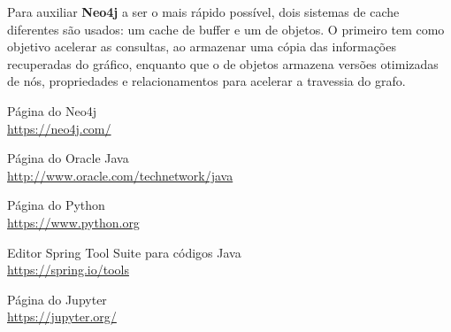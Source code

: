 \documentclass[a4paper,11pt]{article}
\begin{document}
Para auxiliar \textbf{Neo4j} a ser o mais rápido possível, dois sistemas de cache diferentes são usados: um cache de buffer e um de objetos. O primeiro tem como objetivo acelerar as consultas, ao armazenar uma cópia das informações recuperadas do gráfico, enquanto que o de objetos armazena versões otimizadas de nós, propriedades e relacionamentos para acelerar a travessia do grafo.




\begin{thebibliography}{8}
  Página do Neo4j \\
  \url{https://neo4j.com/}

  Página do Oracle Java \\
  \url{http://www.oracle.com/technetwork/java}
  
  Página do Python \\
  \url{https://www.python.org}

  Editor Spring Tool Suite para códigos Java \\
  \url{https://spring.io/tools}

  Página do Jupyter \\
  \url{https://jupyter.org/}

  
\end{thebibliography}
  
\end{document}
